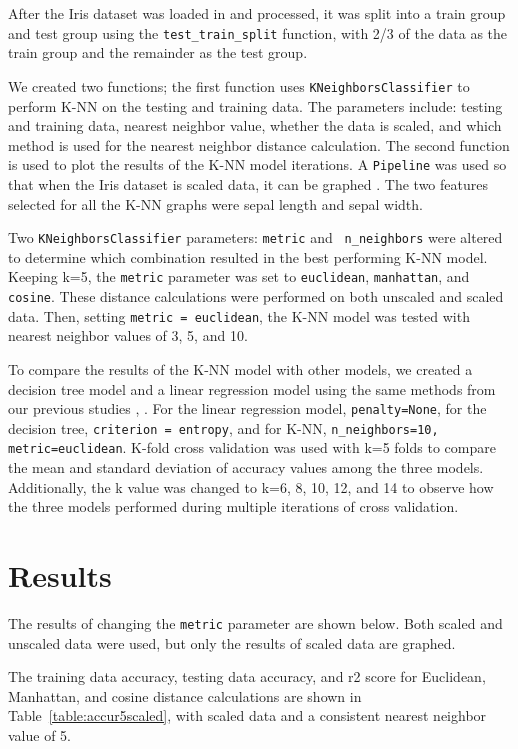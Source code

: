 \documentclass[journal]{IEEEtran}
\begin{document}
After the Iris dataset was loaded in and processed, it was split into a train group and test group using the \lstinline{test_train_split} function, with 2/3 of the data as the train group and the remainder as the test group. 

We created two functions; the first function uses \lstinline{KNeighborsClassifier} to perform K-NN on the testing and training data. The parameters include: testing and training data, nearest neighbor value, whether the data is scaled, and which method is used for the nearest neighbor distance calculation. The second function is used to plot the results of the K-NN model iterations. A \lstinline{Pipeline} was used so that when the Iris dataset is scaled data, it can be graphed \cite{b2}. The two features selected for all the K-NN graphs were sepal length and sepal width. 

Two \lstinline{KNeighborsClassifier} parameters: \lstinline{metric} and \lstinline{ n_neighbors} were altered to determine which combination resulted in the best performing K-NN model. Keeping k=5, the \lstinline{metric} parameter was set to \lstinline{euclidean}, \lstinline{manhattan}, and \lstinline{cosine}. These distance calculations were performed on both unscaled and scaled data. Then, setting \lstinline{metric = euclidean}, the K-NN model was tested with nearest neighbor values of 3, 5, and 10. 

To compare the results of the K-NN model with other models, we created a decision tree model and a linear regression model using the same methods from our previous studies \cite{b3}, \cite{b4}. For the linear regression model, \lstinline{penalty=None}, for the decision tree, \lstinline{criterion = entropy}, and for K-NN, \lstinline{n_neighbors=10, metric=euclidean}. K-fold cross validation \cite{b5} was used with k=5 folds to compare the mean and standard deviation of accuracy values among the three models. Additionally, the k value was changed to k=6, 8, 10, 12, and 14 to observe how the three models performed during multiple iterations of cross validation. 

\section{Results}

The results of changing the \lstinline{metric} parameter are shown below. Both scaled and unscaled data were used, but only the results of scaled data are graphed. 

The training data accuracy, testing data accuracy, and r2 score for Euclidean, Manhattan, and cosine distance calculations are shown in Table~\ref{table:accur5scaled}, with scaled data and a consistent nearest neighbor value of 5. 
\end{document}
